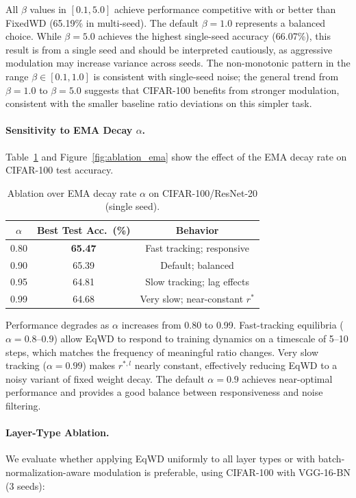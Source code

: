 \documentclass{article}
\begin{document}
All $\beta$ values in $[0.1, 5.0]$ achieve performance competitive
with or better than FixedWD (65.19\% in multi-seed). The default
$\beta = 1.0$ represents a balanced choice. While $\beta = 5.0$
achieves the highest single-seed accuracy (66.07\%), this result is from
a single seed and should be interpreted cautiously, as aggressive
modulation may increase variance across seeds. The non-monotonic pattern
in the range $\beta \in [0.1, 1.0]$ is consistent with single-seed
noise; the general trend from $\beta = 1.0$ to $\beta = 5.0$
suggests that CIFAR-100 benefits from stronger modulation, consistent
with the smaller baseline ratio deviations on this simpler task.

\paragraph{Sensitivity to EMA Decay $\alpha$.}
Table~\ref{tab:ablation_ema} and Figure~\ref{fig:ablation_ema} show the effect of the EMA
decay rate on CIFAR-100 test accuracy.

\begin{table}[t]
\centering
\caption{Ablation over EMA decay rate $\alpha$ on CIFAR-100/ResNet-20 (single seed).}
\label{tab:ablation_ema}
\small
\begin{tabular}{ccc}
\toprule
$\alpha$ & Best Test Acc.\ (\%) & Behavior \\
\midrule
0.80 & \textbf{65.47} & Fast tracking; responsive \\
0.90 & 65.39 & Default; balanced \\
0.95 & 64.81 & Slow tracking; lag effects \\
0.99 & 64.68 & Very slow; near-constant $r^*$ \\
\bottomrule
\end{tabular}
\end{table}

Performance degrades as $\alpha$ increases from 0.80 to 0.99.
Fast-tracking equilibria ($\alpha = 0.8$--$0.9$) allow EqWD to
respond to training dynamics on a timescale of 5--10 steps, which
matches the frequency of meaningful ratio changes. Very slow tracking
($\alpha = 0.99$) makes $r^{*,l}$ nearly constant, effectively
reducing EqWD to a noisy variant of fixed weight decay. The default
$\alpha = 0.9$ achieves near-optimal performance and provides a good
balance between responsiveness and noise filtering.

\paragraph{Layer-Type Ablation.}
We evaluate whether applying EqWD uniformly to all layer types or with
batch-normalization-aware modulation is preferable, using CIFAR-100 with
VGG-16-BN (3 seeds):
\end{document}

